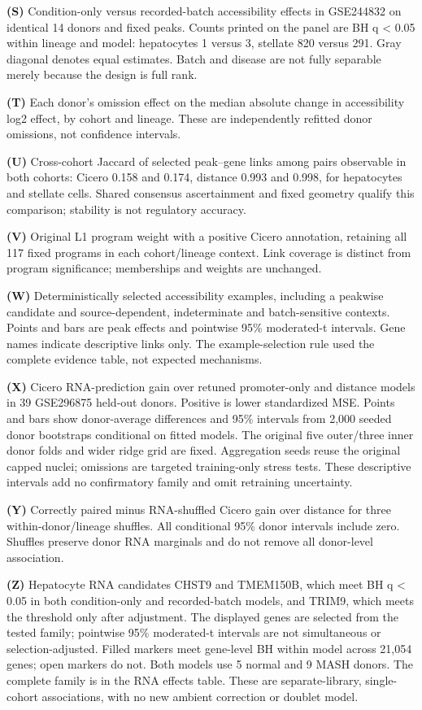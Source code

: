 \textbf{(S)} Condition-only versus recorded-batch accessibility effects in GSE244832 on identical 14 donors and fixed peaks. Counts printed on the panel are BH q \textless{} 0.05 within lineage and model: hepatocytes 1 versus 3, stellate 820 versus 291. Gray diagonal denotes equal estimates. Batch and disease are not fully separable merely because the design is full rank.

\textbf{(T)} Each donor's omission effect on the median absolute change in accessibility log2 effect, by cohort and lineage. These are independently refitted donor omissions, not confidence intervals.

\textbf{(U)} Cross-cohort Jaccard of selected peak--gene links among pairs observable in both cohorts: Cicero 0.158 and 0.174, distance 0.993 and 0.998, for hepatocytes and stellate cells. Shared consensus ascertainment and fixed geometry qualify this comparison; stability is not regulatory accuracy.

\textbf{(V)} Original L1 program weight with a positive Cicero annotation, retaining all 117 fixed programs in each cohort/lineage context. Link coverage is distinct from program significance; memberships and weights are unchanged.

\textbf{(W)} Deterministically selected accessibility examples, including a peakwise candidate and source-dependent, indeterminate and batch-sensitive contexts. Points and bars are peak effects and pointwise 95\% moderated-t intervals. Gene names indicate descriptive links only. The example-selection rule used the complete evidence table, not expected mechanisms.

\textbf{(X)} Cicero RNA-prediction gain over retuned promoter-only and distance models in 39 GSE296875 held-out donors. Positive is lower standardized MSE. Points and bars show donor-average differences and 95\% intervals from 2,000 seeded donor bootstraps conditional on fitted models. The original five outer/three inner donor folds and wider ridge grid are fixed. Aggregation seeds reuse the original capped nuclei; omissions are targeted training-only stress tests. These descriptive intervals add no confirmatory family and omit retraining uncertainty.

\textbf{(Y)} Correctly paired minus RNA-shuffled Cicero gain over distance for three within-donor/lineage shuffles. All conditional 95\% donor intervals include zero. Shuffles preserve donor RNA marginals and do not remove all donor-level association.

\textbf{(Z)} Hepatocyte RNA candidates CHST9 and TMEM150B, which meet BH q \textless{} 0.05 in both condition-only and recorded-batch models, and TRIM9, which meets the threshold only after adjustment. The displayed genes are selected from the tested family; pointwise 95\% moderated-t intervals are not simultaneous or selection-adjusted. Filled markers meet gene-level BH within model across 21,054 genes; open markers do not. Both models use 5 normal and 9 MASH donors. The complete family is in the RNA effects table. These are separate-library, single-cohort associations, with no new ambient correction or doublet model.

